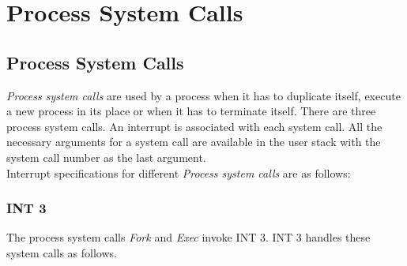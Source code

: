 \chapter{Process System Calls}
\label{chp:process_system_calls}

\section{Process System Calls}
\label{procsyscall}
\textit{Process system calls} are used by a process when it has to duplicate itself, execute a new process in its place or when it has to terminate itself. There are three process system calls. An interrupt is associated with each system call. All the necessary arguments for a system call are available in the user stack with the system call number as the last argument.\\

\noindent Interrupt specifications for different \textit{Process system calls} are as follows:

\subsection{INT 3}
The process system calls \textit{Fork} and \textit{Exec} invoke INT 3. INT 3 handles these system calls as follows.

